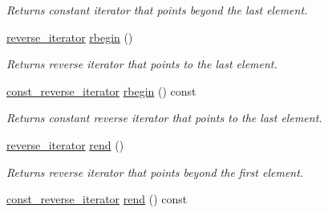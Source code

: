 \begin{CompactItemize}
\begin{CompactList}\small\item\em Returns constant iterator that points beyond the last element. \item\end{CompactList}\item 
\hypertarget{classdai_1_1smallSet_316cf77f22a243a7f68558787b7183c4}{
\hyperlink{classdai_1_1smallSet_6dea3ee0aa40c4312e6278a7d17f516d}{reverse\_\-iterator} \hyperlink{classdai_1_1smallSet_316cf77f22a243a7f68558787b7183c4}{rbegin} ()}
\label{classdai_1_1smallSet_316cf77f22a243a7f68558787b7183c4}

\begin{CompactList}\small\item\em Returns reverse iterator that points to the last element. \item\end{CompactList}\item 
\hypertarget{classdai_1_1smallSet_fe1d0987a5e6df1f488ac59423e60541}{
\hyperlink{classdai_1_1smallSet_46882a9010267d41f447feb6aaf65cc1}{const\_\-reverse\_\-iterator} \hyperlink{classdai_1_1smallSet_fe1d0987a5e6df1f488ac59423e60541}{rbegin} () const }
\label{classdai_1_1smallSet_fe1d0987a5e6df1f488ac59423e60541}

\begin{CompactList}\small\item\em Returns constant reverse iterator that points to the last element. \item\end{CompactList}\item 
\hypertarget{classdai_1_1smallSet_6c13dd3698d76d85f8ed4be564b10f8c}{
\hyperlink{classdai_1_1smallSet_6dea3ee0aa40c4312e6278a7d17f516d}{reverse\_\-iterator} \hyperlink{classdai_1_1smallSet_6c13dd3698d76d85f8ed4be564b10f8c}{rend} ()}
\label{classdai_1_1smallSet_6c13dd3698d76d85f8ed4be564b10f8c}

\begin{CompactList}\small\item\em Returns reverse iterator that points beyond the first element. \item\end{CompactList}\item 
\hypertarget{classdai_1_1smallSet_72f55e13695e993adc7db6fb40b1cd88}{
\hyperlink{classdai_1_1smallSet_46882a9010267d41f447feb6aaf65cc1}{const\_\-reverse\_\-iterator} \hyperlink{classdai_1_1smallSet_72f55e13695e993adc7db6fb40b1cd88}{rend} () const }
\label{classdai_1_1smallSet_72f55e13695e993adc7db6fb40b1cd88}


\end{CompactItemize}
